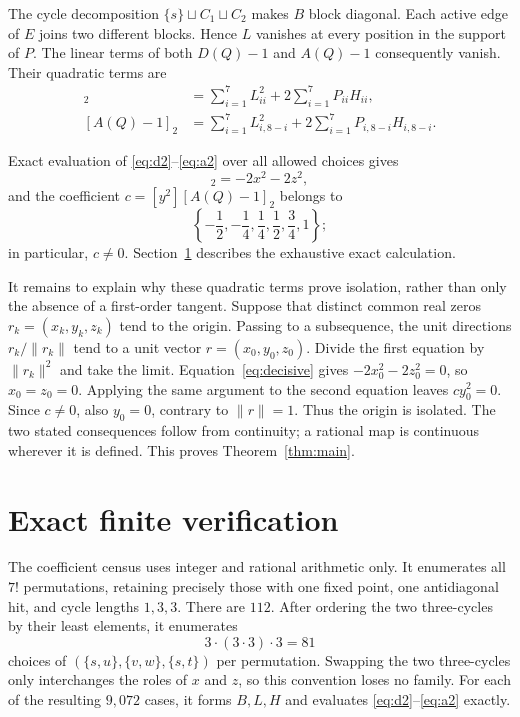 \documentclass[11pt]{article}
\newcommand{\norm}[1]{\lVert #1\rVert}
\begin{document}
The cycle decomposition $\{s\}\sqcup C_1\sqcup C_2$ makes $B$ block
diagonal.  Each active edge of $E$ joins two different blocks.  Hence $L$
vanishes at every position in the support of $P$.  The linear terms of both
$D(Q)-1$ and $A(Q)-1$ consequently vanish.  Their quadratic terms are
\begin{align}
 [D(Q)-1]_2
 &=\sum_{i=1}^7L_{ii}^2
   +2\sum_{i=1}^7P_{ii}H_{ii},\label{eq:d2}\\
 [A(Q)-1]_2
 &=\sum_{i=1}^7L_{i,8-i}^2
   +2\sum_{i=1}^7P_{i,8-i}H_{i,8-i}.\label{eq:a2}
\end{align}

Exact evaluation of \eqref{eq:d2}--\eqref{eq:a2} over all allowed choices
gives
\begin{equation}
 [D(Q)-1]_2=-2x^2-2z^2,\label{eq:decisive}
\end{equation}
and the coefficient $c=[y^2][A(Q)-1]_2$ belongs to
\[
 \left\{-\frac12,-\frac14,\frac14,\frac12,\frac34,1\right\};
\]
in particular, $c\ne0$.  Section~\ref{sec:verification} describes the
exhaustive exact calculation.

It remains to explain why these quadratic terms prove isolation, rather than
only the absence of a first-order tangent.  Suppose that distinct common real
zeros $r_k=(x_k,y_k,z_k)$ tend to the origin.  Passing to a subsequence, the
unit directions $r_k/\norm{r_k}$ tend to a unit vector
$r=(x_0,y_0,z_0)$.  Divide the first equation by $\norm{r_k}^2$ and take the
limit.  Equation~\eqref{eq:decisive} gives
$-2x_0^2-2z_0^2=0$, so $x_0=z_0=0$.  Applying the same argument to the
second equation leaves $c y_0^2=0$.  Since $c\ne0$, also $y_0=0$, contrary
to $\norm{r}=1$.  Thus the origin is isolated.  The two stated consequences
follow from continuity; a rational map is continuous wherever it is defined.
This proves Theorem~\ref{thm:main}.

\section{Exact finite verification}\label{sec:verification}

The coefficient census uses integer and rational arithmetic only.  It
enumerates all $7!$ permutations, retaining precisely those with one fixed
point, one antidiagonal hit, and cycle lengths $1,3,3$.  There are $112$.
After ordering the two three-cycles by their least elements, it enumerates
\[
 3\cdot(3\cdot3)\cdot3=81
\]
choices of $(\{s,u\},\{v,w\},\{s,t\})$ per permutation.  Swapping the two
three-cycles only interchanges the roles of $x$ and $z$, so this convention
loses no family.  For each of the resulting $9{,}072$ cases, it forms
$B,L,H$ and evaluates \eqref{eq:d2}--\eqref{eq:a2} exactly.
\end{document}
